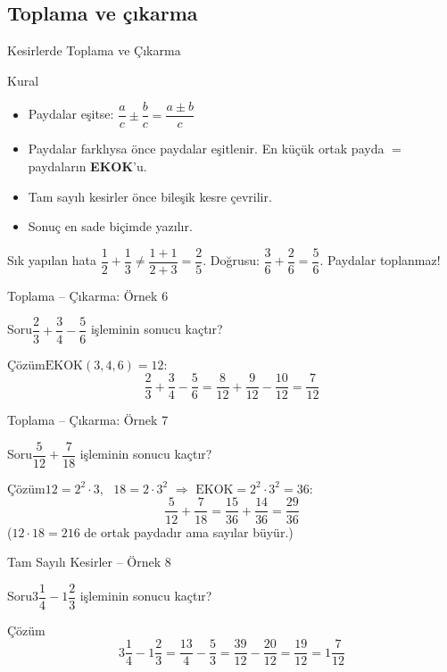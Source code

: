 \documentclass[aspectratio=169,11pt,handout]{beamer}
\newcommand{\soru}[3]{%
\begin{frame}{#1}
  \begin{block}{Soru}\large #2\end{block}
  \pause
  \begin{exampleblock}{Çözüm}\large #3\end{exampleblock}
\end{frame}}
\begin{document}
\subsection{Toplama ve çıkarma}
\begin{frame}{Kesirlerde Toplama ve Çıkarma}
\begin{block}{Kural}
\begin{itemize}
\item Paydalar eşitse: \(\dfrac{a}{c}\pm\dfrac{b}{c}=\dfrac{a\pm b}{c}\)
\item Paydalar farklıysa önce paydalar eşitlenir. En küçük ortak payda \(=\) paydaların \textbf{EKOK}'u.
\item Tam sayılı kesirler önce bileşik kesre çevrilir.
\item Sonuç en sade biçimde yazılır.
\end{itemize}
\end{block}
\begin{alertblock}{Sık yapılan hata}
\(\dfrac{1}{2}+\dfrac{1}{3}\neq\dfrac{1+1}{2+3}=\dfrac{2}{5}\). \quad Doğrusu: \(\dfrac{3}{6}+\dfrac{2}{6}=\dfrac{5}{6}\). \quad Paydalar toplanmaz!
\end{alertblock}
\end{frame}

\soru{Toplama -- Çıkarma: Örnek 6}
{\(\dfrac{2}{3}+\dfrac{3}{4}-\dfrac{5}{6}\) işleminin sonucu kaçtır?}
{\(\text{EKOK}(3,4,6)=12\):
\[\frac{2}{3}+\frac{3}{4}-\frac{5}{6}=\frac{8}{12}+\frac{9}{12}-\frac{10}{12}=\frac{7}{12}\]}

\soru{Toplama -- Çıkarma: Örnek 7}
{\(\dfrac{5}{12}+\dfrac{7}{18}\) işleminin sonucu kaçtır?}
{\(12=2^2\cdot 3\), \ \(18=2\cdot 3^2\) \(\Rightarrow\) \(\text{EKOK}=2^2\cdot 3^2=36\):
\[\frac{5}{12}+\frac{7}{18}=\frac{15}{36}+\frac{14}{36}=\frac{29}{36}\]
(\(12\cdot 18=216\) de ortak paydadır ama sayılar büyür.)}

\soru{Tam Sayılı Kesirler -- Örnek 8}
{\(3\dfrac{1}{4}-1\dfrac{2}{3}\) işleminin sonucu kaçtır?}
{\[3\frac{1}{4}-1\frac{2}{3}=\frac{13}{4}-\frac{5}{3}=\frac{39}{12}-\frac{20}{12}=\frac{19}{12}=1\frac{7}{12}\]}
\end{document}
